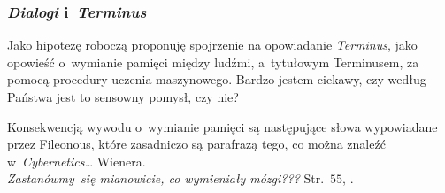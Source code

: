 \documentclass[10pt,t]{beamer}
\begin{document}
\begin{frame}
  \frametitle{\textit{Dialogi} i~\textit{Terminus}}


  Jako hipotezę roboczą proponuję spojrzenie na opowiadanie
  \textit{Terminus}, jako opowieść o~wymianie pamięci między ludźmi,
  a~tytułowym Terminusem, za pomocą procedury uczenia maszynowego. Bardzo
  jestem ciekawy, czy według Państwa jest to sensowny pomysł, czy nie?

  Konsekwencją wywodu o~wymianie pamięci są następujące słowa wypowiadane
  przez Fileonous, które zasadniczo są parafrazą tego, co można znaleźć
  w~\textit{Cybernetics\ldots} Wienera. \\
  \textit{Zastanówmy~się mianowicie, co wymieniały mózgi???}
  Str.~$55$, \parencite{Lem-Dialogi-Vol-I-Pub-1996}.

\end{frame}









































\end{document}
